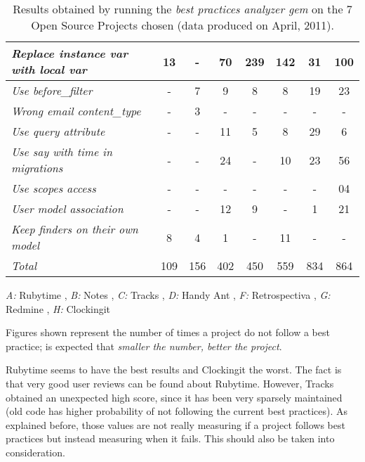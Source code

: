 \begin{table}[H]
\begin{center}
{\begin{threeparttable}
\begin{tabular}{|l||c|c|c|c|c|c|c|}
  \emph{Replace instance var with local var   }              &  13  &   -  &  70  & 239 & 142 &  31 & 100  \\ \hline
  \emph{Use before\_filter                    }              &   -  &   7  &   9  &   8 &   8 &  19 &  23  \\ \hline
  \emph{Wrong email content\_type             }              &   -  &   3  &   -  &   - &   - &   - &   -  \\ \hline
  \emph{Use query attribute                   }              &   -  &   -  &  11  &   5 &   8 &  29 &   6  \\ \hline
  \emph{Use say with time in migrations       }              &   -  &   -  &  24  &   - &  10 &  23 &  56  \\ \hline
  \emph{Use scopes access                     }              &   -  &   -  &   -  &   - &   - &   - &  04  \\ \hline
  \emph{User model association                }              &   -  &   -  &  12  &   9 &   - &   1 &  21  \\ \hline
  \emph{Keep finders on their own model       }              &   8  &   4  &   1  &   - &  11 &   - &   -  \\ \hline
  \emph{Total                                 }              & 109  & 156  & 402  & 450 & 559 & 834 & 864  \\ \hline
  \end{tabular}
  \begin{tablenotes}
    \item \emph{A:} Rubytime
    , \emph{B:} Notes
    , \emph{C:} Tracks
    , \emph{D:} Handy Ant
    , \emph{F:} Retrospectiva
    , \emph{G:} Redmine
    , \emph{H:} Clockingit
    \item Figures shown represent the number of times a project do not follow a best practice; is expected that \emph{smaller the number, better the project}.
  \end{tablenotes}
  \end{threeparttable}
}
\end{center}
\caption{Results obtained by running the \emph{best practices analyzer gem} on the 7 Open Source Projects chosen (data produced on April, 2011).}
\label{table:OSPHWebSites}
\end{table}

Rubytime seems to have the best results and Clockingit the worst. 
The fact is that very good user reviews can be found about Rubytime.
However, Tracks obtained an unexpected high score, since it has been very sparsely maintained 
(old code has higher probability of not following the current best practices).
As explained before, those values are not really measuring if a project follows best practices 
but instead measuring when it fails.
This should also be taken into consideration. 

